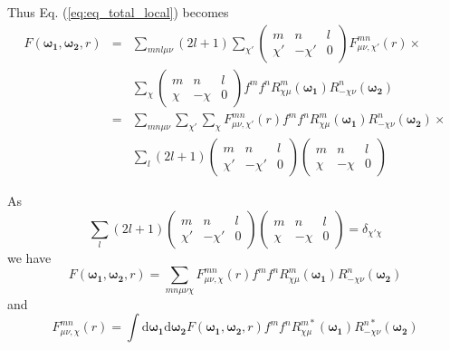 Thus Eq. (\ref{eq:eq_total_local}) becomes
\begin{eqnarray}
F(\boldsymbol{\omega_{1}},\boldsymbol{\omega_{2}},r) & = & \sum_{mnl\mu\nu}\left(2l+1\right)\sum_{\chi'}\left(\begin{array}{ccc}
m & n & l\\
\chi' & -\chi' & 0
\end{array}\right)F_{\mu\nu,\chi'}^{mn}(r)\times\nonumber \\
 &  & \sum_{\chi}\left(\begin{array}{ccc}
m & n & l\\
\chi & -\chi & 0
\end{array}\right)f^{m}f^{n}R_{\chi\mu}^{m}(\boldsymbol{\omega_{1}})R_{-\chi\nu}^{n}(\boldsymbol{\omega_{2}})\nonumber \\
 & = & \sum_{mn\mu\nu}\sum_{\chi'}\sum_{\chi}F_{\mu\nu,\chi'}^{mn}(r)f^{m}f^{n}R_{\chi\mu}^{m}(\boldsymbol{\omega_{1}})R_{-\chi\nu}^{n}(\boldsymbol{\omega_{2}})\times\nonumber \\
 &  & \sum_{l}\left(2l+1\right)\left(\begin{array}{ccc}
m & n & l\\
\chi' & -\chi' & 0
\end{array}\right)\left(\begin{array}{ccc}
m & n & l\\
\chi & -\chi & 0
\end{array}\right)
\end{eqnarray}


As
\begin{equation}
\sum_{l}\left(2l+1\right)\left(\begin{array}{ccc}
m & n & l\\
\chi' & -\chi' & 0
\end{array}\right)\left(\begin{array}{ccc}
m & n & l\\
\chi & -\chi & 0
\end{array}\right)=\delta_{\chi'\chi}
\end{equation}
we have
\begin{equation}
F(\boldsymbol{\omega_{1}},\boldsymbol{\omega_{2}},r)=\sum_{mn\mu\nu\chi}F_{\mu\nu,\chi}^{mn}(r)f^{m}f^{n}R_{\chi\mu}^{m}(\boldsymbol{\omega_{1}})R_{-\chi\nu}^{n}(\boldsymbol{\omega_{2}})\label{eq:local-forward}
\end{equation}
and
\begin{equation}
F_{\mu\nu,\chi}^{mn}(r)=\int\mathrm{d}\boldsymbol{\omega_{1}}\mathrm{d}\boldsymbol{\omega_{2}}F(\boldsymbol{\omega_{1}},\boldsymbol{\omega_{2}},r)f^{m}f^{n}R_{\chi\mu}^{m*}(\boldsymbol{\omega_{1}})R_{-\chi\nu}^{n*}(\boldsymbol{\omega_{2}})\label{eq:local_backward}
\end{equation}


